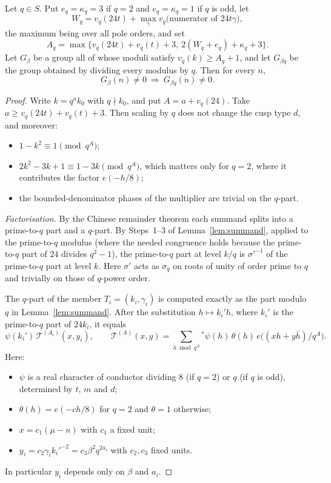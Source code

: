 \documentclass[11pt]{amsart}
\theoremstyle{definition}\newtheorem{definition}[theorem]{Definition}
\theoremstyle{remark}\newtheorem{remark}[theorem]{Remark}
\begin{document}
\begin{proposition}\label{prop:stable}
Let $q\in S$. Put $e_q=\kappa_q=3$ if $q=2$ and $e_q=\kappa_q=1$ if $q$ is odd, let
\[
W_q=v_q(24t)+\max_\gamma v_q\big(\text{numerator of }24t\gamma\big),
\]
the maximum being over all pole orders, and set
\[
A_q=\max\big\{v_q(24t)+v_q(t)+3,\ 2(W_q+e_q)+\kappa_q+3\big\}.
\]
Let $G_\beta$ be a group all of whose moduli satisfy $v_q(k)\ge A_q+1$, and let $G_{\beta q}$ be the group obtained by dividing every modulus by $q$. Then for every $n$,
\[
G_\beta(n)\neq0\ \Longrightarrow\ G_{\beta q}(n)\neq0 .
\]
\end{proposition}
\begin{proof}
Write $k=q^ak_0$ with $q\nmid k_0$, and put $A=a+v_q(24)$. Take $a\ge v_q(24t)+v_q(t)+3$. Then scaling by $q$ does not change the cusp type $d$, and moreover:
\begin{itemize}[leftmargin=1.5em]
\item $1-k^2\equiv1\pmod{q^A}$;
\item $2k^2-3k+1\equiv1-3k\pmod{q^A}$, which matters only for $q=2$, where it contributes the factor $e(-h/8)$;
\item the bounded-denominator phases of the multiplier are trivial on the $q$-part.
\end{itemize}

\emph{Factorisation.} By the Chinese remainder theorem each summand splits into a prime-to-$q$ part and a $q$-part. By Steps~1--3 of Lemma~\ref{lem:summand}, applied to the prime-to-$q$ modulus (where the needed congruence holds because the prime-to-$q$ part of $24$ divides $q^2-1$), the prime-to-$q$ part at level $k/q$ is $\sigma'^{-1}$ of the prime-to-$q$ part at level $k$. Here $\sigma'$ acts as $\sigma_{\bar q}$ on roots of unity of order prime to $q$ and trivially on those of $q$-power order.

The $q$-part of the member $T_i=(k_i,\gamma_i)$ is computed exactly as the part modulo $q$ in Lemma~\ref{lem:summand}. After the substitution $h\mapsto k_i'h$, where $k_i'$ is the prime-to-$q$ part of $24k_i$, it equals
\[
\psi(k_i')\,\mathcal T^{(A_i)}(x,y_i),\qquad \mathcal T^{(A)}(x,y)=\sum_{h\bmod q^{A}}{}^{*}\psi(h)\,\theta(h)\,e\big((xh+y\bar h)/q^{A}\big).
\]
Here:
\begin{itemize}[leftmargin=1.5em]
\item $\psi$ is a real character of conductor dividing $8$ (if $q=2$) or $q$ (if $q$ is odd), determined by $t$, $m$ and $d$;
\item $\theta(h)=e(-ch/8)$ for $q=2$ and $\theta=1$ otherwise;
\item $x=c_1(\mu-n)$ with $c_1$ a fixed unit;
\item $y_i=c_2\gamma_i k_i'^{-2}=c_3\beta^2q^{2a_i}$ with $c_2,c_3$ fixed units.
\end{itemize}
In particular $y_i$ depends only on $\beta$ and $a_i$.


\end{proof}
\end{document}
